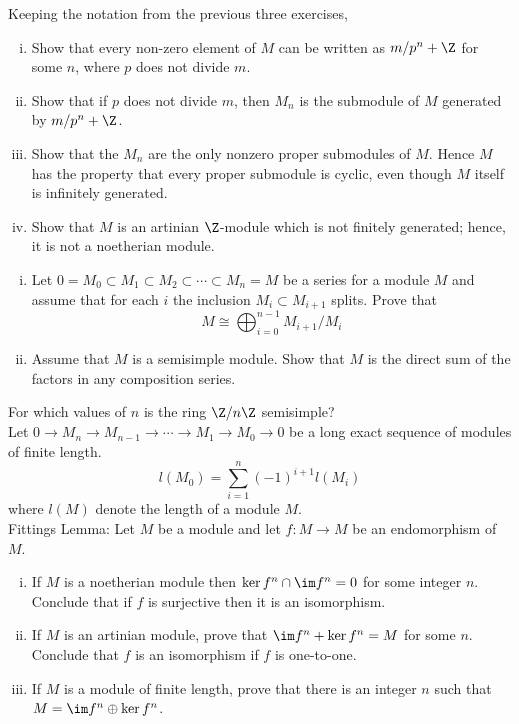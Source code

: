 \prob Keeping the notation from the previous three exercises,
	\begin{enumerate}[(i)]
	\item Show that every non-zero element of $M$ can be written as $m/p^n+\Z$ for some $n$, where $p$ does not divide $m$.
	\item Show that if $p$ does not divide $m$, then $M_n$ is the submodule of $M$ generated by $m/p^n+\Z$.
	\item Show that the $M_n$ are the only nonzero proper submodules of $M$. Hence $M$ has the property that every proper submodule is cyclic, even though $M$ itself is infinitely generated.
	\item Show that $M$ is an artinian $\Z$-module which is not finitely generated; hence, it is not a noetherian module. \\
	\end{enumerate}


\prob 
	\begin{enumerate}[(i)]
	\item Let $0=M_0 \subset M_1 \subset M_2 \subset \cdots \subset M_n=M$ be a series for a module $M$ and assume that for each $i$ the inclusion $M_i \subset M_{i+1}$ splits. Prove that
	\[ M \cong \bigoplus_{i=0}^{n-1} M_{i+1}/M_i \]
\item Assume that $M$ is a semisimple module. Show that $M$ is the direct sum of the factors in any composition series. \\
	\end{enumerate}


\prob For which values of $n$ is the ring $\Z/n\Z$ semisimple? \\


\prob Let $0 \longrightarrow M_n \longrightarrow M_{n-1} \longrightarrow \cdots \longrightarrow M_1 \longrightarrow M_0 \longrightarrow 0$ be a long exact sequence of modules of finite length.
	\[ l(M_0)=\sum_{i=1}^n (-1)^{i+1} l(M_i) \] 
where $l(M)$ denote the length of a module $M$. \\


\prob Fittings Lemma: Let $M$ be a module and let $f: M \rightarrow M$ be an endomorphism of $M$.
	\begin{enumerate}[(i)]
	\item If $M$ is a noetherian module then $\ker f^n \cap \im f^n=0$ for some integer $n$. Conclude that if $f$ is surjective then it is an isomorphism. 
	\item If $M$ is an artinian module, prove that $\im f^n+ \ker f^n=M$ for some $n$. Conclude that $f$ is an isomorphism if $f$ is one-to-one. 
	\item If $M$ is a module of finite length, prove that there is an integer $n$ such that $M=\im f^n \oplus \ker f^n$. \\
	\end{enumerate}


